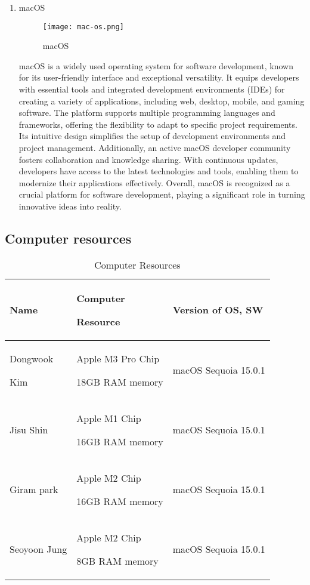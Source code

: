 \documentclass[conference]{IEEEtran}
\begin{document}
\begin{enumerate}[itemsep=2ex, parsep=1ex]
	      \vspace{5cm}
	      	      
	\item macOS
	      	              
	      \begin{figure}[h!]
	      	\centering
	      	\texttt{[image: mac-os.png]}
	      	\caption{macOS}
	      	\label{fig:macOS}
	      \end{figure}
	      	      
	      macOS is a widely used operating system for software development, known for
	      its user-friendly interface and exceptional versatility. It equips
	      developers with essential tools and integrated development environments (IDEs)
	      for creating a variety of applications, including web, desktop, mobile,
	      and gaming software. The platform supports multiple programming languages and
	      frameworks, offering the flexibility to adapt to specific project
	      requirements. Its intuitive design simplifies the setup of development environments
	      and project management. Additionally, an active macOS developer community fosters
	      collaboration and knowledge sharing. With continuous updates, developers have
	      access to the latest technologies and tools, enabling them to modernize
	      their applications effectively. Overall, macOS is recognized as a crucial
	      platform for software development, playing a significant role in turning innovative
	      ideas into reality.
\end{enumerate}

\subsection{Computer resources}

\begin{table}[h!]
	\caption{Computer Resources}
	\def\arraystretch{1.4} \small
	\begin{tabular}{|p{1.8cm}|p{2.7cm}|p{3.1cm}|}
		\hline
		Name              & Computer \par Resource                 & Version of OS, SW    \\
		\hline
		Dongwook \par Kim & Apple M3 Pro Chip \par 18GB RAM memory & macOS Sequoia 15.0.1 \\
		\hline
		Jisu Shin         & Apple M1 Chip \par 16GB RAM memory     & macOS Sequoia 15.0.1 \\
		\hline
		Giram park        & Apple M2 Chip \par 16GB RAM memory     & macOS Sequoia 15.0.1 \\
		\hline
		Seoyoon Jung      & Apple M2 Chip \par 8GB RAM memory      & macOS Sequoia 15.0.1 \\
		\hline
	\end{tabular}
\end{table}
\end{document}
